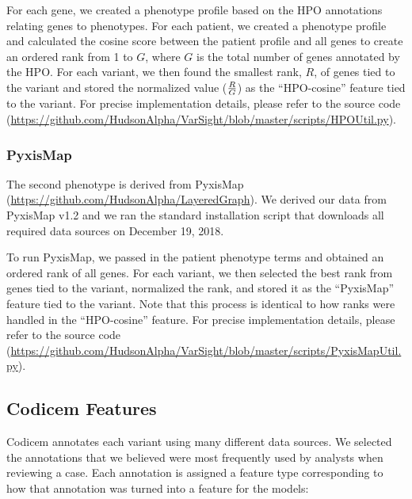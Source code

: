 \documentclass{article}
\begin{document}
For each gene, we created a phenotype profile based on the HPO annotations relating genes to phenotypes.  For each patient, we created a phenotype profile and calculated the cosine score between the patient profile and all genes to create an ordered rank from 1 to $G$, where $G$ is the total number of genes annotated by the HPO.  For each variant, we then found the smallest rank, $R$, of genes tied to the variant and stored the normalized value (${R \over G}$) as the ``HPO-cosine'' feature tied to the variant.  For precise implementation details, please refer to the source code (\url{https://github.com/HudsonAlpha/VarSight/blob/master/scripts/HPOUtil.py}).

\subsubsection{PyxisMap}
The second phenotype is derived from PyxisMap (\url{https://github.com/HudsonAlpha/LayeredGraph}).  We derived our data from PyxisMap v1.2 and we ran the standard installation script that downloads all required data sources on December 19, 2018.

To run PyxisMap, we passed in the patient phenotype terms and obtained an ordered rank of all genes.  For each variant, we then selected the best rank from genes tied to the variant, normalized the rank, and stored it as the ``PyxisMap'' feature tied to the variant.  Note that this process is identical to how ranks were handled in the ``HPO-cosine'' feature.  For precise implementation details, please refer to the source code (\url{https://github.com/HudsonAlpha/VarSight/blob/master/scripts/PyxisMapUtil.py}).

\subsection{Codicem Features}
Codicem annotates each variant using many different data sources.  We selected the annotations that we believed were most frequently used by analysts when reviewing a case.  Each annotation is assigned a feature type corresponding to how that annotation was turned into a feature for the models:
\end{document}
